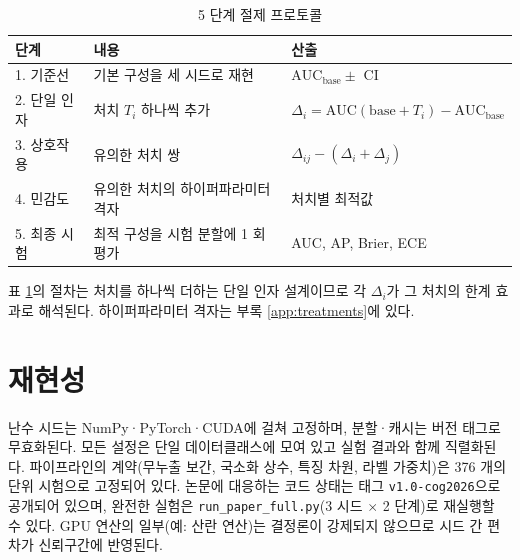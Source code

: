 \begin{table}[htbp]
  \centering
  \caption{5 단계 절제 프로토콜}
  \label{tab:protocol}
  \small
  \begin{tabular}{@{}lll@{}}
    \toprule
    단계 & 내용 & 산출 \\
    \midrule
    1. 기준선 & 기본 구성을 세 시드로 재현 & $\mathrm{AUC}_{\mathrm{base}} \pm$ CI \\
    2. 단일 인자 & 처치 $T_i$ 하나씩 추가 & $\Delta_i = \mathrm{AUC}(\mathrm{base} + T_i) - \mathrm{AUC}_{\mathrm{base}}$ \\
    3. 상호작용 & 유의한 처치 쌍 & $\Delta_{ij} - (\Delta_i + \Delta_j)$ \\
    4. 민감도 & 유의한 처치의 하이퍼파라미터 격자 & 처치별 최적값 \\
    5. 최종 시험 & 최적 구성을 시험 분할에 1 회 평가 & AUC, AP, Brier, ECE \\
    \bottomrule
  \end{tabular}
\end{table}

표 \ref{tab:protocol}의 절차는 처치를 하나씩 더하는 단일 인자 설계이므로 각 $\Delta_i$가 그 처치의 한계 효과로 해석된다. 하이퍼파라미터 격자는 부록 \ref{app:treatments}에 있다.

\section{재현성}
\label{sec:setup-repro}

난수 시드는 NumPy·PyTorch·CUDA에 걸쳐 고정하며, 분할·캐시는 버전 태그로 무효화된다. 모든 설정은 단일 데이터클래스에 모여 있고 실험 결과와 함께 직렬화된다. 파이프라인의 계약(무누출 보간, 국소화 상수, 특징 차원, 라벨 가중치)은 376 개의 단위 시험으로 고정되어 있다. 논문에 대응하는 코드 상태는 태그 \texttt{v1.0-cog2026}으로 공개되어 있으며, 완전한 실험은 \texttt{run\_paper\_full.py}(3 시드 $\times$ 2 단계)로 재실행할 수 있다. GPU 연산의 일부(예: 산란 연산)는 결정론이 강제되지 않으므로 시드 간 편차가 신뢰구간에 반영된다.
